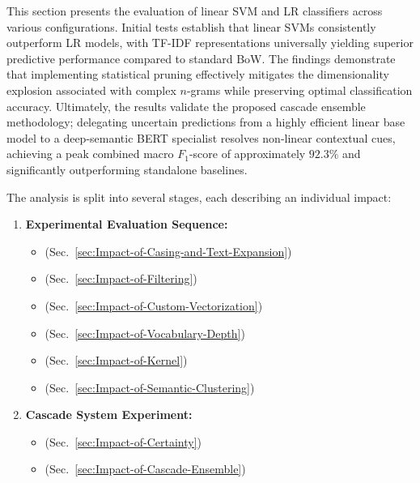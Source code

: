 \documentclass[a4paper,twoside,12pt]{book}
\newcommand{\logreg}{LR}
\begin{document}
This section presents the evaluation of linear SVM and \logreg{} classifiers across various configurations. Initial tests establish that linear SVMs consistently outperform \logreg{} models, with TF-IDF representations universally yielding superior predictive performance compared to standard BoW. The findings demonstrate that implementing statistical pruning effectively mitigates the dimensionality explosion associated with complex $n$-grams while preserving optimal classification accuracy. Ultimately, the results validate the proposed cascade ensemble methodology; delegating uncertain predictions from a highly efficient linear base model to a deep-semantic BERT specialist resolves non-linear contextual cues, achieving a peak combined macro $F_1$-score of approximately $92.3\%$ and significantly outperforming standalone baselines.

The analysis is split into several stages, each describing an individual impact:

\begin{enumerate}
	\item \textbf{Experimental Evaluation Sequence:}
	\begin{itemize}
		\item {} (Sec.~\ref{sec:Impact-of-Casing-and-Text-Expansion})
		\item {} (Sec.~\ref{sec:Impact-of-Filtering})
		\item {} (Sec.~\ref{sec:Impact-of-Custom-Vectorization})
		\item {} (Sec.~\ref{sec:Impact-of-Vocabulary-Depth})
		\item {} (Sec.~\ref{sec:Impact-of-Kernel})
		\item {} (Sec.~\ref{sec:Impact-of-Semantic-Clustering})
	\end{itemize}
	
	\item \textbf{Cascade System Experiment:}
	\begin{itemize}
		\item {} (Sec.~\ref{sec:Impact-of-Certainty})
		\item {} (Sec.~\ref{sec:Impact-of-Cascade-Ensemble})
	\end{itemize}
\end{enumerate}
\end{document}

